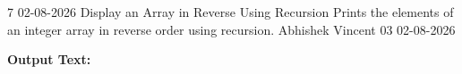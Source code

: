 \clearpage
\label{prog:07}
\programhead
  {7}
  {02-08-2026}
  {Display an Array in Reverse Using Recursion}
  {Prints the elements of an integer array in reverse order using recursion.}
  {Abhishek Vincent}
  {03}
  {02-08-2026}

\divider
\textbf{Output Text:}\par
\vspace{2pt}

